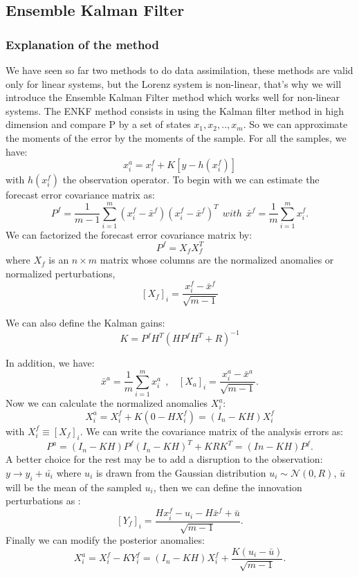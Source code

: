 





\subsection{Ensemble Kalman Filter}
\subsubsection{Explanation of the method}
\noindent We have seen so far two methods to do data assimilation, these methods are valid only for linear systems, but the Lorenz system is non-linear, that's why we will introduce the Ensemble Kalman Filter method which works well for non-linear systems. The ENKF method consists in using the Kalman filter method in high dimension and compare P by a set of states $x_1,x_2,..,x_{m}$. So we can approximate the moments of the error by the moments of the sample.
For all the samples, we have:
$$x_i^a=x_i^f+K[y-h(x_i^f)]$$
with $h(x_i^f)$ the observation operator.
\newline \noindent To begin with we can estimate the
forecast error covariance matrix as:
$$P^f=\frac{1}{m-1}\sum_{i=1}^{m}(x_i^f-\bar{x}^f)(x_i^f-\bar{x}^f)^T~~with~~\bar{x}^f=\frac{1}{m}\sum_{i=1}^{m}x_i^f .$$ 
\noindent We can factorized the forecast error covariance matrix by:
$$P^f=X_f X_f^T$$
where $X_f$ is an $n \times m$ matrix whose columns are the normalized anomalies or normalized perturbations,
$$[X_f]_i=\frac{x_i^f-\bar{x}^f}{\sqrt{m-1}}$$

\noindent We can also define the Kalman gains: 
$$K=P^f H^T(HP^f H^T+R)^{-1}$$

\noindent In addition, we have:
$$
\bar{x}^a=\frac{1}{m}\sum_{i=1}^mx_i^a~~,~~~~[X_a]_i=\frac{x_i^a-\bar{x}^a}{\sqrt{m-1}}. $$
\noindent Now we can calculate the normalized anomalies $X_i^a:$
$$X_i^a=X_i^f+K(0-HX_i^f)=(I_n-KH)X_i^f$$
\noindent with $X_i^f\equiv [X_f]_i$.
\newline \noindent We can write the covariance matrix of the analysis errors as:
$$P^a=(I_n-KH)P^f(I_n-KH)^T+KRK^T=(In-KH)P^f.$$
\noindent A better choice for the rest may be to add a disruption to the observation: $y\rightarrow y_i+\bar{u_i}$ where $u_i$ is drawn from the Gaussian distribution $u_i \sim \mathcal{N}(0,R)$, $\bar{u}$ will be the mean of the sampled $u_i$, then we can define the innovation perturbations as :
$$[Y_f]_i=\frac{Hx_i^f-u_i-H\bar{x}^f+\bar{u}}{\sqrt{m-1}}.$$
\noindent Finally we can modify the posterior anomalies:
$$X_i^a=X_i^f-KY_i^f=(I_n-KH)X_i^f+\frac{K(u_i-\bar{u})}{\sqrt{m-1}}.$$
\newpage
